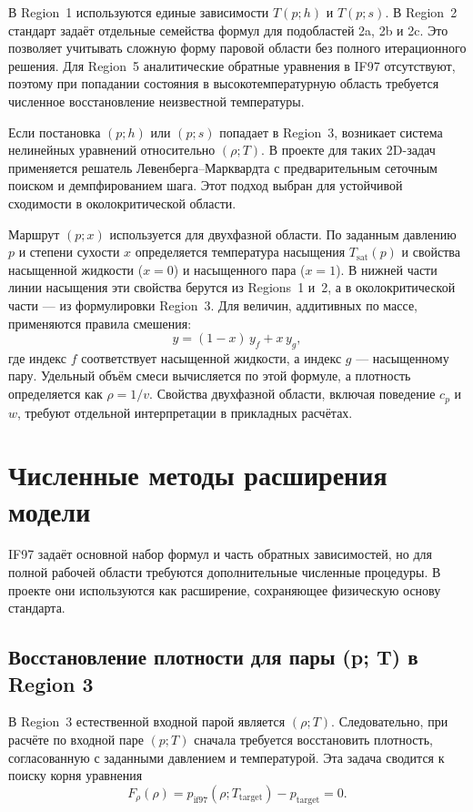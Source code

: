 В Region~1 используются единые зависимости
$T(p; h)$ и $T(p; s)$.
В Region~2 стандарт задаёт отдельные семейства формул
для подобластей 2a, 2b и 2c.
Это позволяет учитывать сложную форму паровой области
без полного итерационного решения.
Для Region~5 аналитические обратные уравнения
в IF97 отсутствуют,
поэтому при попадании состояния в высокотемпературную область
требуется численное восстановление неизвестной температуры.

Если постановка $(p; h)$ или $(p; s)$ попадает в Region~3,
возникает система нелинейных уравнений относительно $(\rho; T)$.
В проекте для таких 2D-задач применяется решатель
Левенберга--Марквардта с предварительным сеточным поиском
и демпфированием шага.
Этот подход выбран для устойчивой сходимости
в околокритической области.

Маршрут $(p; x)$ используется для двухфазной области.
По заданным давлению $p$ и степени сухости $x$ определяется температура насыщения $T_{\mathrm{sat}}(p)$ и свойства насыщенной жидкости
($x=0$) и насыщенного пара ($x=1$).
В нижней части линии насыщения
эти свойства берутся из Regions~1 и~2,
а в околокритической части ---
из формулировки Region~3.
Для величин, аддитивных по массе, применяются правила смешения:
\begin{equation}
y = (1-x)\,y_{f} + x\,y_{g},
\end{equation}
где индекс $f$ соответствует насыщенной жидкости, а индекс $g$ --- насыщенному пару.
Удельный объём смеси вычисляется по этой формуле, а плотность определяется как $\rho = 1/v$.
Свойства двухфазной области, включая поведение $c_p$ и $w$,
требуют отдельной интерпретации в прикладных расчётах.

\section{Численные методы расширения модели}

IF97 задаёт основной набор формул и часть обратных зависимостей,
но для полной рабочей области требуются дополнительные численные процедуры.
В проекте они используются как расширение,
сохраняющее физическую основу стандарта.

\subsection{Восстановление плотности для пары (p; T) в Region 3}

В Region~3 естественной входной парой является $(\rho; T)$.
Следовательно, при расчёте по входной паре $(p; T)$
сначала требуется восстановить плотность,
согласованную с заданными давлением и температурой.
Эта задача сводится к поиску корня уравнения
\begin{equation}
F_{\rho}(\rho) = p_{\mathrm{if97}}(\rho; T_{\mathrm{target}}) - p_{\mathrm{target}} = 0.
\end{equation}

